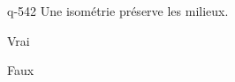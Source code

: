 \begin{truefalse}{q-542}
Une isométrie préserve les milieux.
\item* Vrai
\item Faux
\end{truefalse}

